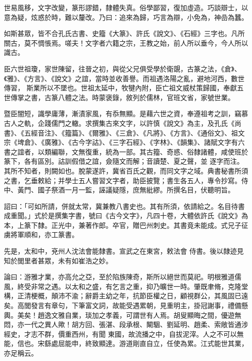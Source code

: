 \begin{pinyinscope}
 世易風移，文字改變，篆形謬錯，隸體失真。俗學鄙習，復加虛造。巧談辯士，以意為疑，炫惑於時，難以釐改。乃曰：追來為歸，巧言為辯，小免為，神嵒為蠶。



 如斯甚眾，皆不合孔氏古書、史籀《大篆》、許氏《說文》、《石經》三字也。凡所關古，莫不惆悵焉。嗟夫！文字者六籍之宗，王教之始，前人所以垂今，今人所以識古。



 臣六世祖瓊，家世陳留，往晉之初，與從父兄俱受學於衛覬，古篆之法，《倉》、《雅》、《方言》、《說文》之誼，當時並收善譽。而祖遇洛陽之亂，避地河西，數世傳習，
 斯業所以不墜也。世祖太延中，牧犍內附，臣亡祖文威杖策歸國，奉獻五世傳掌之書，古篆八體之法。時蒙褒錄，敘列於儒林，官班文省，家號世業。



 暨臣闇短，識學庸薄，漸漬家風，有忝無顯。是藉六世之資，奉遵祖考之訓，竊慕古人之軌，企踐儒門之轍。求撰集古來文字，以許慎《說文》為主，及孔氏《尚書》、《五經音注》、《籀篇》、《爾雅》、《三倉》、《凡將》、《方言》、《通俗文》、祖文宗《埤倉》、《廣雅》、《古今字詁》、《三字石經》、《字林》、《韻集》、諸賦文字有六書之誼者，以類編聯，文無復重，統為一部。其古籀、奇惑、俗隸諸體，咸使班於篆下，各有區別。詁訓假借之誼，僉隨文而解；音讀楚、夏之聲，並
 逐字而注。其所不知者，則闕如也。脫蒙遂許，冀省百氏之觀，而同文字之域。典書秘書所須之書，乞垂敕給；并學士五人嘗習文字者，助臣披覽；書生各五人，專令抄寫。侍中、黃門、國子祭酒一月一監，誣議疑隱，庶無紕繆。所撰名目，伏聽明旨。



 詔曰：「可如所請，併就太常，冀兼教八書史也。其有所須，依請給之。名目待書成重聞。」式於是撰集字書，號曰《古今文字》，凡四十卷，大體依許氏《說文》為本，上篆下隸。正光中，兼著作郎。卒官，贈巴州刺史。其書竟未能成。式兄子征虜將軍順和，亦工篆書。



 先是，太和中，兗州人沈法會能隸書。宣武之在東宮，敕法會
 侍書。後以隸迹見知於閭里者甚眾，未有如崔浩之妙。



 論曰：游雅才業，亦高允之亞，至於陷族陳奇，斯所以絕世而莫祀。明根雅道儒風，終受非常之遇。以太和之盛，有乞言之重，抑乃曠世一時。肇既聿脩，克隆堂構，正清梗概，顛沛不渝；辭爵主幼之年，抗節臣權之日，顧視群公，其風固已遠矣。高閭發言有章句，下筆富文詞，故能受遇累朝，見重明主，掛冠謝事，禮備懸輿。美矣！趙逸文雅自業，琰加之孝義，可謂世有人焉。胡叟顯晦之間，優遊無悶，亦一代之異人歟！胡方回、張湛、段承根、闞駰、劉延明、趙柔、索敞皆通涉經史，才志不群，價重西州，有聞
 東國，故流播之中，自拔泥滓。人之不可以無能，信也。宋繇處屈能申，終致顯達。游道剛直自立，任使為累。江式能世其業，亦足稱云。



\end{pinyinscope}